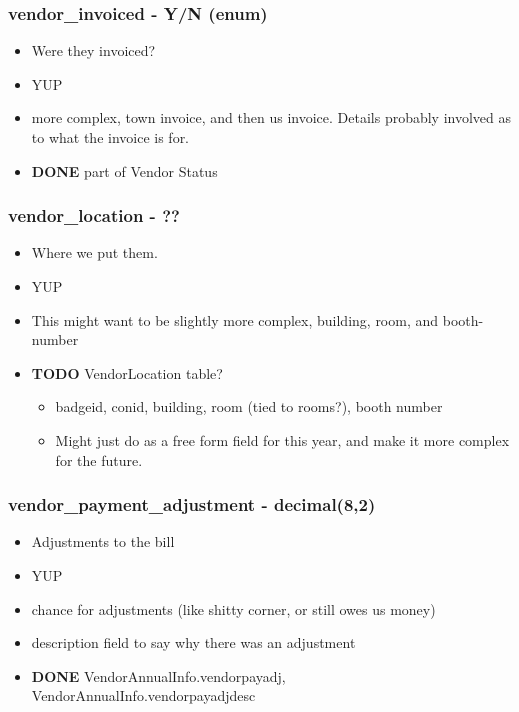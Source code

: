\documentclass[captions=tablesignature]{scrartcl}
\begin{document}
\subsubsection{vendor\_invoiced - Y/N (enum)}
\label{sec-2-2-13}
\begin{itemize}
\item Were they invoiced?
\item YUP
\item more complex, town invoice, and then us invoice.  Details probably
involved as to what the invoice is for.
\end{itemize}
\begin{itemize}
\item {\bfseries\sffamily DONE} part of Vendor Status
\label{sec-2-2-13-1}
\end{itemize}

\subsubsection{vendor\_location - ??}
\label{sec-2-2-14}
\begin{itemize}
\item Where we put them.
\item YUP
\item This might want to be slightly more complex, building, room, and
booth-number
\end{itemize}
\begin{itemize}
\item {\bfseries\sffamily TODO} VendorLocation table?
\label{sec-2-2-14-1}
\begin{itemize}
\item badgeid, conid, building, room (tied to rooms?), booth number
\item Might just do as a free form field for this year, and make it
more complex for the future.
\end{itemize}
\end{itemize}

\subsubsection{vendor\_payment\_adjustment - decimal(8,2)}
\label{sec-2-2-15}
\begin{itemize}
\item Adjustments to the bill
\item YUP
\item chance for adjustments (like shitty corner, or still owes us money)
\item description field to say why there was an adjustment
\end{itemize}
\begin{itemize}
\item {\bfseries\sffamily DONE} VendorAnnualInfo.vendorpayadj, VendorAnnualInfo.vendorpayadjdesc
\label{sec-2-2-15-1}
\end{itemize}
\end{document}
